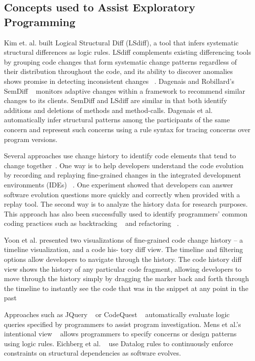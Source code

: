 \subsection{Concepts used to Assist Exploratory Programming}
Kim et. al. built Logical Structural Diff (LSdiff), a tool that infers systematic structural differences as logic rules. LSdiff complements existing differencing tools by grouping code changes that form systematic change patterns regardless of their distribution throughout the code, and its ability to discover anomalies shows promise in detecting inconsistent changes ~\cite{Kim:2009}. Dagenais and Robillard's SemDiff ~\cite{Dagenais:2008} monitors adaptive changes within a framework to recommend similar changes to its clients. SemDiff and LSdiff are similar in that both identify additions and deletions of methods and method-calls. Dagenais et al. automatically infer structural patterns among the participants of the same concern and represent such concerns using a rule syntax for tracing concerns over program versions.

Several approaches use change history to identify code elements that tend to change together~\cite{Gall:1998, Ying:2004, Zimmermann:2004}. One way is to help developers understand the code evolution by recording and replaying fine-grained changes in the integrated development environments (IDEs) ~\cite{Maruyama:2012, Hattori:2011, Hattori:2010}. One experiment showed that developers can answer software evolution questions more quickly and correctly when provided with a replay tool. The second way is to analyze the history data for research purposes. This approach has also been successfully used to identify programmers' common coding practices such as backtracking ~\cite{Yoon:2012} and refactoring ~\cite{Vakilian:2012}. 

Yoon et al. presented two visualizations of fine-grained code change history -- a timeline visualization, and a code his- tory diff view. The timeline and filtering options allow developers to navigate through the history. The code history diff view shows the history of any particular code fragment, allowing developers to move through the history simply by dragging the marker back and forth through the timeline to instantly see the code that was in the snippet at any point in the past ~\cite{Yoon:2013}

Approaches such as JQuery ~\cite{Janzen:2003} or CodeQuest ~\cite{Hajiyev:2006} automatically evaluate logic queries specified by programmers to assist program investigation. Mens et al.'s intentional view ~\cite{Mens:2002} allows programmers to specify concerns or design patterns using logic rules. Eichberg et al. ~\cite{Eichberg:2008} use Datalog rules to continuously enforce constraints on structural dependencies as software evolves. 


